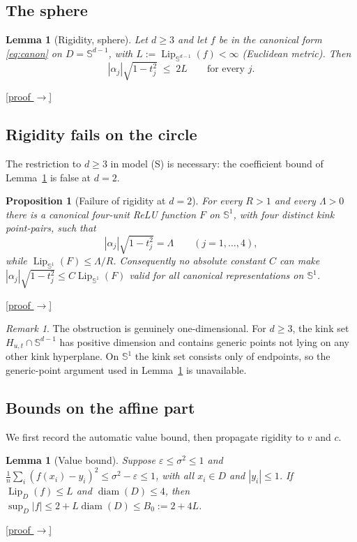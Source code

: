 \documentclass[11pt,reqno]{amsart}
\theoremstyle{plain}
\newtheorem{proposition}[theorem]{Proposition}
\newtheorem{lemma}[theorem]{Lemma}
\theoremstyle{definition}
\theoremstyle{remark}
\newtheorem{remark}[theorem]{Remark}
\newcommand{\Sd}{\mathbb{S}^{d-1}}
\newcommand{\eps}{\varepsilon}
\newcommand{\Lip}{\operatorname{Lip}}
\newcommand{\proofbutton}[1]{\hyperref[proof:#1]{\textnormal{\footnotesize\textsf{[proof $\to$]}}}}
\begin{document}
\subsection{The sphere}

\begin{lemma}[Rigidity, sphere]\label{lem:rigidity-sphere}
Let $d\ge3$ and let $f$ be in the canonical form \eqref{eq:canon} on $D=\Sd$, with $L:=\Lip_{\Sd}(f)<\infty$ (Euclidean metric). Then
\[
|\alpha_j|\sqrt{1-t_j^2}\;\le\;2L\qquad\text{for every }j.
\]
\end{lemma}
\proofbutton{rigidity-sphere}

\subsection{Rigidity fails on the circle}

The restriction to $d\ge3$ in model (S) is necessary: the coefficient bound of Lemma~\ref{lem:rigidity-sphere} is false at $d=2$.

\begin{proposition}[Failure of rigidity at $d=2$]\label{prop:d2}
For every $R>1$ and every $\Lambda>0$ there is a canonical four-unit ReLU function $F$ on $\mathbb S^1$, with four distinct kink point-pairs, such that
\[
        |\alpha_j|\sqrt{1-t_j^2}=\Lambda\qquad (j=1,\dots,4),
\]
while $\Lip_{\mathbb S^1}(F)\le \Lambda/R$.  Consequently no absolute constant $C$ can make
$|\alpha_j|\sqrt{1-t_j^2}\le C\Lip_{\mathbb S^1}(F)$ valid for all canonical representations on $\mathbb S^1$.
\end{proposition}
\proofbutton{d2}

\begin{remark}
The obstruction is genuinely one-dimensional.  For $d\ge3$, the kink set $H_{u,t}\cap\mathbb S^{d-1}$ has positive dimension and contains generic points not lying on any other kink hyperplane.  On $\mathbb S^1$ the kink set consists only of endpoints, so the generic-point argument used in Lemma~\ref{lem:rigidity-sphere} is unavailable.
\end{remark}

\subsection{Bounds on the affine part}

We first record the automatic value bound, then propagate rigidity to $v$ and $c$.

\begin{lemma}[Value bound]\label{lem:B0}
Suppose $\eps\le\sigma^2\le1$ and $\frac1n\sum_i(f(x_i)-y_i)^2\le\sigma^2-\eps\le1$, with all $x_i\in D$ and $|y_i|\le1$. If $\Lip_D(f)\le L$ and $\operatorname{diam}(D)\le4$, then $\sup_D|f|\le2+L\operatorname{diam}(D)\le B_0:=2+4L$.
\end{lemma}
\proofbutton{B0}
\end{document}
